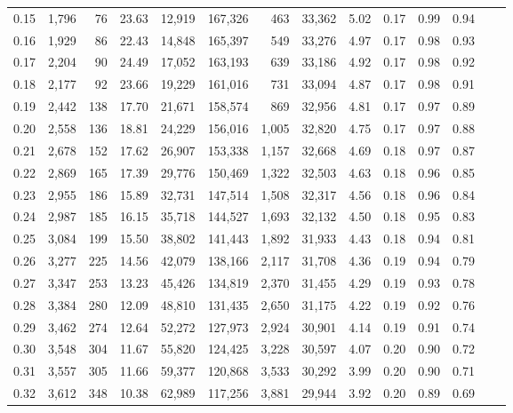 \begin{tabular}{rrrrrrrrrrrrrr}
0.15 &  1,796 &   76 &   23.63 &   12,919 &  167,326 &     463 &  33,362 &  5.02 &  0.17 &  0.99 &      0.94 \\
0.16 &  1,929 &   86 &   22.43 &   14,848 &  165,397 &     549 &  33,276 &  4.97 &  0.17 &  0.98 &      0.93 \\
0.17 &  2,204 &   90 &   24.49 &   17,052 &  163,193 &     639 &  33,186 &  4.92 &  0.17 &  0.98 &      0.92 \\
0.18 &  2,177 &   92 &   23.66 &   19,229 &  161,016 &     731 &  33,094 &  4.87 &  0.17 &  0.98 &      0.91 \\
0.19 &  2,442 &  138 &   17.70 &   21,671 &  158,574 &     869 &  32,956 &  4.81 &  0.17 &  0.97 &      0.89 \\
0.20 &  2,558 &  136 &   18.81 &   24,229 &  156,016 &   1,005 &  32,820 &  4.75 &  0.17 &  0.97 &      0.88 \\
0.21 &  2,678 &  152 &   17.62 &   26,907 &  153,338 &   1,157 &  32,668 &  4.69 &  0.18 &  0.97 &      0.87 \\
0.22 &  2,869 &  165 &   17.39 &   29,776 &  150,469 &   1,322 &  32,503 &  4.63 &  0.18 &  0.96 &      0.85 \\
0.23 &  2,955 &  186 &   15.89 &   32,731 &  147,514 &   1,508 &  32,317 &  4.56 &  0.18 &  0.96 &      0.84 \\
0.24 &  2,987 &  185 &   16.15 &   35,718 &  144,527 &   1,693 &  32,132 &  4.50 &  0.18 &  0.95 &      0.83 \\
0.25 &  3,084 &  199 &   15.50 &   38,802 &  141,443 &   1,892 &  31,933 &  4.43 &  0.18 &  0.94 &      0.81 \\
0.26 &  3,277 &  225 &   14.56 &   42,079 &  138,166 &   2,117 &  31,708 &  4.36 &  0.19 &  0.94 &      0.79 \\
0.27 &  3,347 &  253 &   13.23 &   45,426 &  134,819 &   2,370 &  31,455 &  4.29 &  0.19 &  0.93 &      0.78 \\
0.28 &  3,384 &  280 &   12.09 &   48,810 &  131,435 &   2,650 &  31,175 &  4.22 &  0.19 &  0.92 &      0.76 \\
0.29 &  3,462 &  274 &   12.64 &   52,272 &  127,973 &   2,924 &  30,901 &  4.14 &  0.19 &  0.91 &      0.74 \\
0.30 &  3,548 &  304 &   11.67 &   55,820 &  124,425 &   3,228 &  30,597 &  4.07 &  0.20 &  0.90 &      0.72 \\
0.31 &  3,557 &  305 &   11.66 &   59,377 &  120,868 &   3,533 &  30,292 &  3.99 &  0.20 &  0.90 &      0.71 \\
0.32 &  3,612 &  348 &   10.38 &   62,989 &  117,256 &   3,881 &  29,944 &  3.92 &  0.20 &  0.89 &      0.69 \\

\end{tabular}

